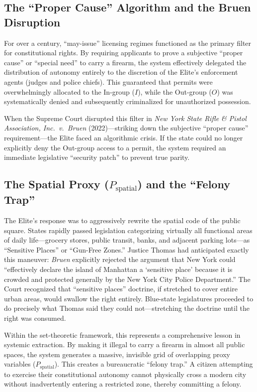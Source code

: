 \subsection{The ``Proper Cause'' Algorithm and the Bruen Disruption}
For over a century, ``may-issue'' licensing regimes functioned as the primary filter for constitutional rights. By requiring applicants to prove a subjective ``proper cause'' or ``special need'' to carry a firearm, the system effectively delegated the distribution of autonomy entirely to the discretion of the Elite's enforcement agents (judges and police chiefs). This guaranteed that permits were overwhelmingly allocated to the In-group ($I$), while the Out-group ($O$) was systematically denied and subsequently criminalized for unauthorized possession.

When the Supreme Court disrupted this filter in \textit{New York State Rifle \& Pistol Association, Inc.\ v.\ Bruen} (2022)---striking down the subjective ``proper cause'' requirement---the Elite faced an algorithmic crisis. If the state could no longer explicitly deny the Out-group access to a permit, the system required an immediate legislative ``security patch'' to prevent true parity.

\subsection{The Spatial Proxy (\texorpdfstring{$P_{\text{spatial}}$}{P\_spatial}) and the ``Felony Trap''}
The Elite's response was to aggressively rewrite the spatial code of the public square. States rapidly passed legislation categorizing virtually all functional areas of daily life---grocery stores, public transit, banks, and adjacent parking lots---as ``Sensitive Places'' or ``Gun-Free Zones.'' Justice Thomas had anticipated exactly this maneuver: \textit{Bruen} explicitly rejected the argument that New York could ``effectively declare the island of Manhattan a `sensitive place' because it is crowded and protected generally by the New York City Police Department.'' The Court recognized that ``sensitive places'' doctrine, if stretched to cover entire urban areas, would swallow the right entirely. Blue-state legislatures proceeded to do precisely what Thomas said they could not---stretching the doctrine until the right was consumed.

Within the set-theoretic framework, this represents a comprehensive lesson in systemic extraction.
 By making it illegal to carry a firearm in almost all public spaces, the system generates a massive, invisible grid of overlapping proxy variables ($P_{\text{spatial}}$). This creates a bureaucratic ``felony trap.'' A citizen attempting to exercise their constitutional autonomy cannot physically cross a modern city without inadvertently entering a restricted zone, thereby committing a felony.

